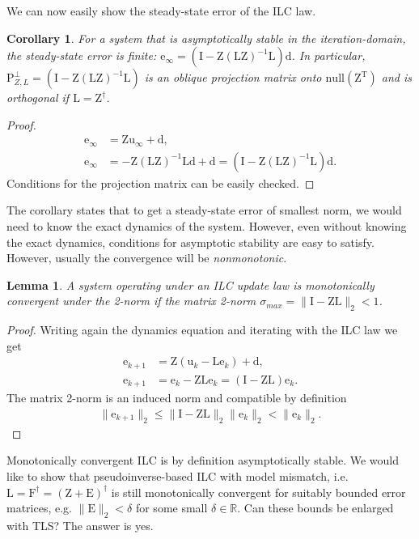 \documentclass[10pt,a4paper]{article}
\theoremstyle{plain}
\newtheorem{cor}{Corollary}[section]
\newtheorem{lem}{Lemma}
\theoremstyle{definition}
\newcommand{\boldvec}[1]{\boldsymbol{\mathrm{#1}}}
\let\vec\boldvec
\newcommand{\error}{\vec{e}} %
\newcommand{\linDist}{\vec{d}} %
\newcommand{\sysInput}{\vec{u}} %
\newcommand{\latentMat}{\vec{Z}} %
\newcommand{\errorMat}{\vec{E}} %
\newcommand{\lmatrix}{\vec{L}} %
\newcommand{\systemMat}{\vec{F}} %
\newcommand{\projOblique}{\vec{P}_{Z,L}^{\perp}} %
\begin{document}
%
We can now easily show the steady-state error of the ILC law.
%
\begin{cor}
For a system that is asymptotically stable in the iteration-domain, the steady-state error is finite: $\error_{\infty} = (\vec{I} - \latentMat(\lmatrix\latentMat)^{-1}\lmatrix)\linDist$. In particular, $\projOblique = (\vec{I} - \latentMat(\lmatrix\latentMat)^{-1}\lmatrix)$ is an oblique projection matrix onto $\mathrm{null}(\latentMat^{\mathrm{T}})$ and is orthogonal if $\lmatrix = \latentMat^{\dagger}$.
\end{cor}
%
\begin{proof}
%
\begin{align}
\error_{\infty} &= \latentMat\sysInput_{\infty} + \linDist, \\
\error_{\infty} &= -\latentMat(\lmatrix\latentMat)^{-1}\lmatrix\linDist + \linDist = (\vec{I} - \latentMat(\lmatrix\latentMat)^{-1}\lmatrix)\linDist.
\end{align}
%
Conditions for the projection matrix can be easily checked.
\end{proof}
%
The corollary states that to get a steady-state error of smallest norm, we would need to know the exact dynamics of the system. However, even without knowing the exact dynamics, conditions for asymptotic stability are easy to satisfy. However, usually the convergence will be \emph{nonmonotonic}.
%
\begin{lem} A system operating under an ILC update law is monotonically convergent under the 2-norm if the matrix 2-norm $\sigma_{max} = \|\vec{I} - \latentMat\lmatrix\|_2 < 1$. \end{lem}
%
\begin{proof}
Writing again the dynamics equation and iterating with the ILC law we get
%
\begin{align}
\error_{k+1} &= \latentMat(\sysInput_k - \lmatrix\error_k) + \linDist, \\
\error_{k+1} &= \error_{k} - \latentMat\lmatrix\error_k = (\vec{I} - \latentMat\lmatrix)\error_k.
\end{align}
%
The matrix 2-norm is an induced norm and compatible by definition
%
\begin{align}
\|\error_{k+1}\|_2 \leq \|\vec{I} - \latentMat\lmatrix\|_2 \|\error_{k}\|_2 < \|\error_{k}\|_2.
\end{align}
\end{proof}
%
Monotonically convergent ILC is by definition asymptotically stable. We would like to show that pseudoinverse-based ILC with model mismatch, i.e. $\lmatrix = \systemMat^{\dagger} = (\latentMat + \errorMat)^{\dagger}$ is still monotonically convergent for suitably bounded error matrices, e.g. $\|\errorMat\|_2 < \delta$ for some small $\delta \in \mathbb{R}$. Can these bounds be enlarged with TLS? The answer is yes.
\end{document}
